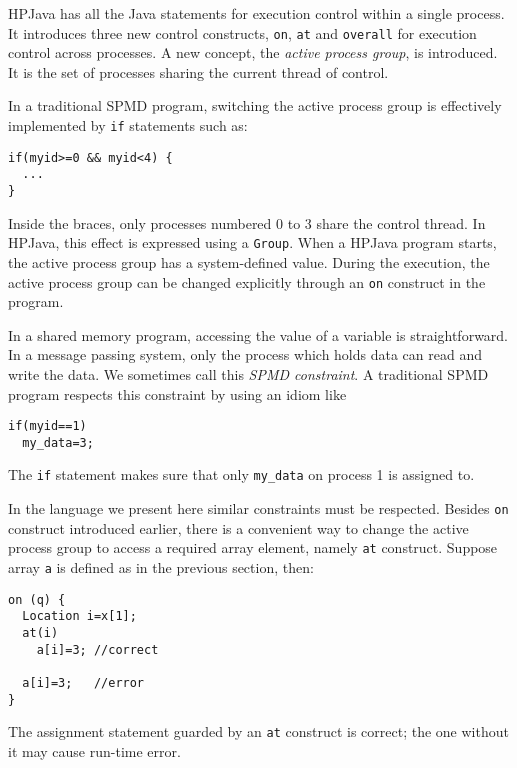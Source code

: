 HPJava has all the Java statements for execution control
within a single process.  It introduces three new control
constructs, \texttt{on}, \texttt{at} and \texttt{overall} for execution
control across processes.
A new concept, the \emph{active process group}, is introduced. It is the
set of processes sharing the current thread of control.

In a traditional SPMD program, switching the active
process group is effectively implemented by \texttt{if} statements
such as:
\small
\begin{verbatim}
if(myid>=0 && myid<4) {
  ...
}
\end{verbatim}
\normalsize
Inside the braces, only processes numbered 0 to 3
share the control thread.
In HPJava, this effect is expressed using a \texttt{Group}.
When a HPJava program starts, the active process group has a
system-defined value.  During the execution, the active process group
can be changed explicitly through an \texttt{on} construct in the
program.

In a shared memory program, accessing the value of a variable is
straightforward. In a message passing system, only the process which
holds data can read and write the data.  We sometimes call this {\em
SPMD constraint}.  A traditional SPMD program respects this constraint
by using an idiom like
\small
\begin{verbatim}
if(myid==1) 
  my_data=3;
\end{verbatim}
\normalsize
The \texttt{if} statement makes sure that only \texttt{my\_data}
on process 1 is assigned to.

In the language we present here similar constraints must be respected.
Besides \texttt{on} construct introduced earlier, there is a
convenient way to change the active process group to access a required
array element, namely \texttt{at} construct.
Suppose array \texttt{a} is defined as in the previous section, then:
\small
\begin{verbatim}
on (q) {
  Location i=x[1];
  at(i)
    a[i]=3; //correct

  a[i]=3;   //error
}
\end{verbatim}
\normalsize
The assignment statement guarded by an \texttt{at} construct is correct;
the one without it may cause run-time error.

